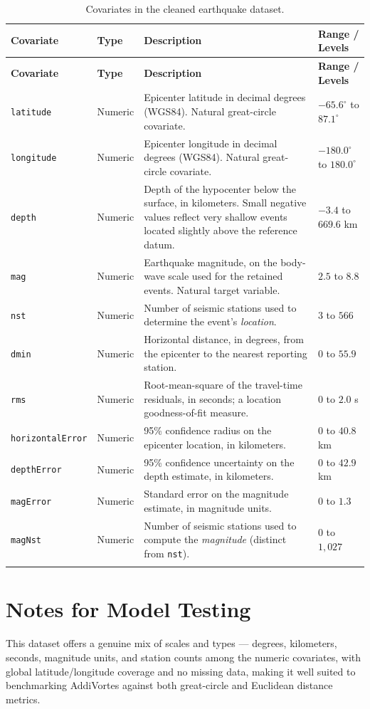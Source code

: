 \documentclass[11pt]{article}
\begin{document}
\begin{longtable}{p{2.6cm}p{1.6cm}p{6.3cm}p{3.5cm}}
\toprule
\textbf{Covariate} & \textbf{Type} & \textbf{Description} & \textbf{Range / Levels} \\
\midrule
\endfirsthead
\toprule
\textbf{Covariate} & \textbf{Type} & \textbf{Description} & \textbf{Range / Levels} \\
\midrule
\endhead

\texttt{latitude} & Numeric & Epicenter latitude in decimal degrees (WGS84). Natural great-circle covariate. & $-65.6^{\circ}$ to $87.1^{\circ}$ \\
\addlinespace
\texttt{longitude} & Numeric & Epicenter longitude in decimal degrees (WGS84). Natural great-circle covariate. & $-180.0^{\circ}$ to $180.0^{\circ}$ \\
\addlinespace
\texttt{depth} & Numeric & Depth of the hypocenter below the surface, in kilometers. Small negative values reflect very shallow events located slightly above the reference datum. & $-3.4$ to $669.6$ km \\
\addlinespace
\texttt{mag} & Numeric & Earthquake magnitude, on the body-wave scale used for the retained events. Natural target variable. & $2.5$ to $8.8$ \\
\addlinespace
\texttt{nst} & Numeric & Number of seismic stations used to determine the event's \emph{location}. & $3$ to $566$ \\
\addlinespace
\texttt{dmin} & Numeric & Horizontal distance, in degrees, from the epicenter to the nearest reporting station. & $0$ to $55.9$ \\
\addlinespace
\texttt{rms} & Numeric & Root-mean-square of the travel-time residuals, in seconds; a location goodness-of-fit measure. & $0$ to $2.0$ s \\
\addlinespace
\texttt{horizontalError} & Numeric & 95\% confidence radius on the epicenter location, in kilometers. & $0$ to $40.8$ km \\
\addlinespace
\texttt{depthError} & Numeric & 95\% confidence uncertainty on the depth estimate, in kilometers. & $0$ to $42.9$ km \\
\addlinespace
\texttt{magError} & Numeric & Standard error on the magnitude estimate, in magnitude units. & $0$ to $1.3$ \\
\addlinespace
\texttt{magNst} & Numeric & Number of seismic stations used to compute the \emph{magnitude} (distinct from \texttt{nst}). & $0$ to $1{,}027$ \\
\addlinespace
\bottomrule
\caption{Covariates in the cleaned earthquake dataset.}
\label{tab:covariates}
\end{longtable}

\section{Notes for Model Testing}

This dataset offers a
genuine mix of scales and types --- degrees, kilometers, seconds, magnitude
units, and station counts among the numeric covariates, with global latitude/longitude coverage and no missing
data, making it well suited to benchmarking AddiVortes against both great-circle
and Euclidean distance metrics.
\end{document}
